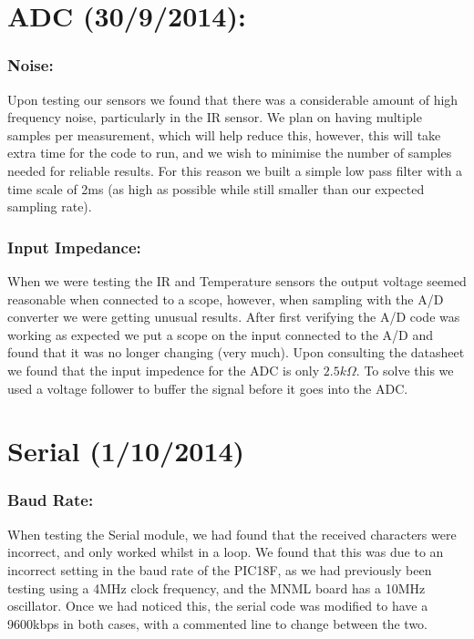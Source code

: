 \documentclass[]{article}
\begin{document}
\section{ADC (30/9/2014):}
\subsubsection{Noise:}
Upon testing our sensors we found that there was a considerable amount of high frequency noise, particularly in the IR sensor. We plan on having multiple samples per measurement, which will help reduce this, however, this will take extra time for the code to run, and we wish to minimise the number of samples needed for reliable results. For this reason we built a simple low pass filter with a time scale of 2ms (as high as possible while still smaller than our expected sampling rate).

\subsubsection{Input Impedance:}
When we were testing the IR and Temperature sensors the output voltage seemed reasonable when connected to a scope, however, when sampling with the A/D converter we were getting unusual results. After first verifying the A/D code was working as expected we put a scope on the input connected to the A/D and found that it was no longer changing (very much). Upon consulting the datasheet we found that the input impedence for the ADC is only $2.5k\Omega$. To solve this we used a voltage follower to buffer the signal before it goes into the ADC.

\section{Serial (1/10/2014)}
\subsubsection{Baud Rate:}
When testing the Serial module, we had found that the received characters were incorrect, and only worked whilst in a loop. We found that this was due to an incorrect setting in the baud rate of the PIC18F, as we had previously been testing using a 4MHz clock frequency, and the MNML board has a 10MHz oscillator. Once we had noticed this, the serial code was modified to have a 9600kbps in both cases, with a commented line to change between the two. 
\end{document}
